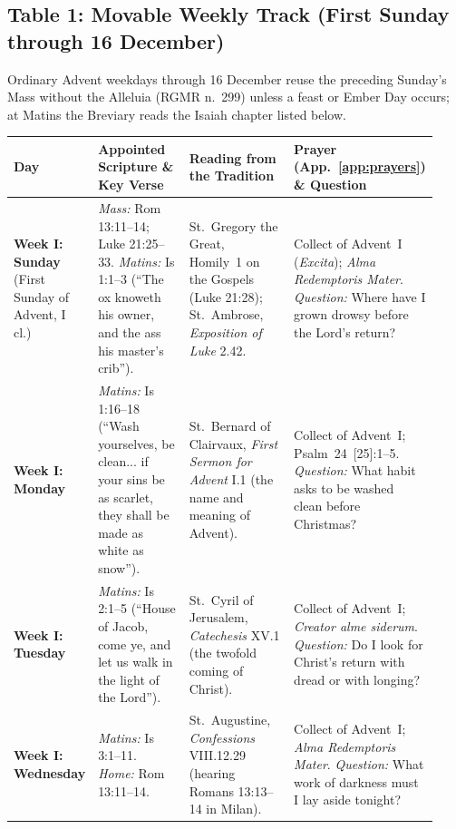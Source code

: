 \subsection{Table 1: Movable Weekly Track (First Sunday through 16 December)}

Ordinary Advent weekdays through 16 December reuse the preceding Sunday's Mass
without the Alleluia (RGMR n.~299) unless a feast or Ember Day occurs; at
Matins the Breviary reads the Isaiah chapter listed below.

{\footnotesize
\begin{longtable}{>{\raggedright\arraybackslash}p{0.14\linewidth}>{\raggedright\arraybackslash}p{0.25\linewidth}>{\raggedright\arraybackslash}p{0.28\linewidth}>{\raggedright\arraybackslash}p{0.26\linewidth}}
\toprule
\textbf{Day} & \textbf{Appointed Scripture \& Key Verse} & \textbf{Reading from the Tradition} & \textbf{Prayer (App.~\ref{app:prayers}) \& Question}\\
\midrule
\endhead
\textbf{Week I: Sunday} (First Sunday of Advent, I cl.) & \textit{Mass:} Rom 13:11--14; Luke 21:25--33. \textit{Matins:} Is 1:1--3 (``The ox knoweth his owner, and the ass his master's crib''). & St.~Gregory the Great, Homily~1 on the Gospels (Luke 21:28); St.~Ambrose, \textit{Exposition of Luke} 2.42. & Collect of Advent~I (\textit{Excita}); \textit{Alma Redemptoris Mater}. \textit{Question:} Where have I grown drowsy before the Lord's return?\\
\textbf{Week I: Monday} & \textit{Matins:} Is 1:16--18 (``Wash yourselves, be clean... if your sins be as scarlet, they shall be made as white as snow''). & St.~Bernard of Clairvaux, \textit{First Sermon for Advent} I.1 (the name and meaning of Advent). & Collect of Advent~I; Psalm~24~[25]:1--5. \textit{Question:} What habit asks to be washed clean before Christmas?\\
\textbf{Week I: Tuesday} & \textit{Matins:} Is 2:1--5 (``House of Jacob, come ye, and let us walk in the light of the Lord''). & St.~Cyril of Jerusalem, \textit{Catechesis} XV.1 (the twofold coming of Christ). & Collect of Advent~I; \textit{Creator alme siderum}. \textit{Question:} Do I look for Christ's return with dread or with longing?\\
\textbf{Week I: Wednesday} & \textit{Matins:} Is 3:1--11. \textit{Home:} Rom 13:11--14. & St.~Augustine, \textit{Confessions} VIII.12.29 (hearing Romans 13:13--14 in Milan). & Collect of Advent~I; \textit{Alma Redemptoris Mater}. \textit{Question:} What work of darkness must I lay aside tonight?\\

\end{longtable}}
